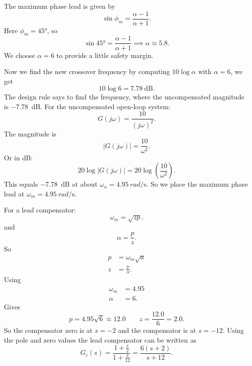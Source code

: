 The maximum phase lead is given by
\begin{equation*}
  \sin \phi_m = \frac{\alpha - 1 }{\alpha + 1}
.\end{equation*}
Here $\phi_m = \ang{45}$, so
\begin{equation*}
  \sin \ang{45} = \frac{\alpha - 1}{\alpha + 1} \implies \alpha \approx \num{5,8} 
.\end{equation*}
We choose $\alpha = 6$ to provide a little safety margin.

Now we find the new crossover frequency by computing $10 \log \alpha$ with $\alpha = 6$, we get
\begin{equation*}
  10 \log 6 = \qty{7,78}{\dB} 
.\end{equation*}
The design rule says to find the frequency, where the uncompensated magnitude is \qty{-7,78}{\dB}.
For the uncompensated open-loop system:
\begin{equation*}
  G(j\omega) = \frac{10}{\left( j\omega \right)^2}
.\end{equation*}
The magnitude is
\begin{equation*}
  \left| G(j\omega) \right| = \frac{10}{\omega^2}
.\end{equation*}
Or in \unit{\dB}:
\begin{equation*}
  20 \log \left| G(j\omega) \right| = 20 \log \left( \frac{10}{\omega^2} \right)
.\end{equation*}
This equals \qty{-7,78}{\dB} at about $\omega_n = \qty{4,95}{rad\per\s}$.
So we place the maximum phase lead at $\omega_m = \qty{4,95}{rad\per\s}$.

For a lead compensator:
\begin{equation*}
  \omega_m = \sqrt{zp}
.\end{equation*}
and
\begin{equation*}
  \alpha = \frac{p}{z}
.\end{equation*}
So
\begin{align*}
  p &= \omega_m \sqrt{a} \\
  z &= \frac{p}{\alpha}
.\end{align*}
Using
\begin{align*}
  \omega_m &= \num{4,95}  \\
  \alpha &= 6
.\end{align*}
Gives
\begin{equation*}
  p = \num{4,95} \sqrt{6} \approx \num{12,0}  \qquad z = \frac{\num{12,0} }{6} = \num{2,0} 
.\end{equation*}
So the compensator zero is at $s = -2$ and the compensator is at $s = -12$. 
Using the pole and zero values the lead compensator can be written as
\begin{equation*}
  G_c(s) = \frac{1 + \frac{s}{2}}{1 + \frac{s}{12}} = \frac{6(s + 2)}{s + 12}
.\end{equation*}

